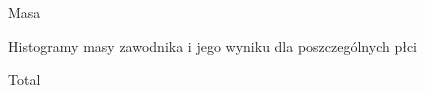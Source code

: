 \documentclass[
  letterpaper,
  DIV=11,
  numbers=noendperiod]{scrartcl}
\begin{document}
\begin{figure}

\begin{minipage}[t]{0.50\linewidth}

{\centering 


\caption{Masa}

}

\end{minipage}%
%
\begin{minipage}[t]{0.50\linewidth}

{\centering 


\caption{Total}

}

\end{minipage}%
\newline
\begin{minipage}[t]{0.50\linewidth}

{\centering 

Histogramy masy zawodnika i jego wyniku dla poszczególnych płci

}

\end{minipage}%

\end{figure}
\end{document}
